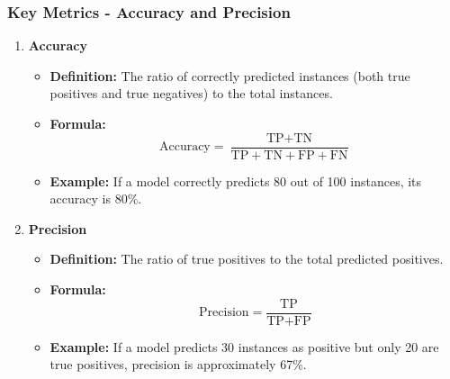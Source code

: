 \documentclass[aspectratio=169]{beamer}
\begin{document}
\begin{frame}[fragile]
  \frametitle{Key Metrics - Accuracy and Precision}
  \begin{enumerate}
    \item \textbf{Accuracy}
      \begin{itemize}
        \item \textbf{Definition:} The ratio of correctly predicted instances (both true positives and true negatives) to the total instances.
        \item \textbf{Formula:} 
          \begin{equation}
          \text{Accuracy} = \frac{\text{TP} + \text{TN}}{\text{TP} + \text{TN} + \text{FP} + \text{FN}}
          \end{equation}
        \item \textbf{Example:} If a model correctly predicts 80 out of 100 instances, its accuracy is 80\%.
      \end{itemize}

    \item \textbf{Precision}
      \begin{itemize}
        \item \textbf{Definition:} The ratio of true positives to the total predicted positives.
        \item \textbf{Formula:}
          \begin{equation}
          \text{Precision} = \frac{\text{TP}}{\text{TP} + \text{FP}}
          \end{equation}
        \item \textbf{Example:} If a model predicts 30 instances as positive but only 20 are true positives, precision is approximately 67\%.
      \end{itemize}
  \end{enumerate}
\end{frame}
\end{document}
